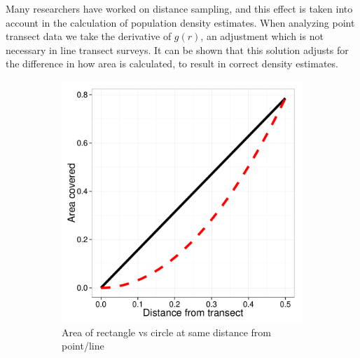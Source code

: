 \documentclass[12pt]{article}
\begin{document}
Many researchers have worked on distance sampling, and this effect is taken into account in the calculation of population density estimates. When analyzing point transect data we take the derivative of $g(r)$, an adjustment which is not necessary in line transect surveys. It can be shown that this solution adjusts for the difference in how area is calculated, to result in correct density estimates. 


\begin{figure}
	\centering
	\begin{subfigure}[b]{0.45\textwidth}
		\includegraphics[width=\textwidth]{../images/rect-circ-area.pdf}
		\caption{Area of rectangle vs circle at same distance from point/line}
		\label{fig:perfectArea}
	\end{subfigure}
	\begin{subfigure}[b]{0.45\textwidth}

\end{subfigure}
\end{figure}
\end{document}
